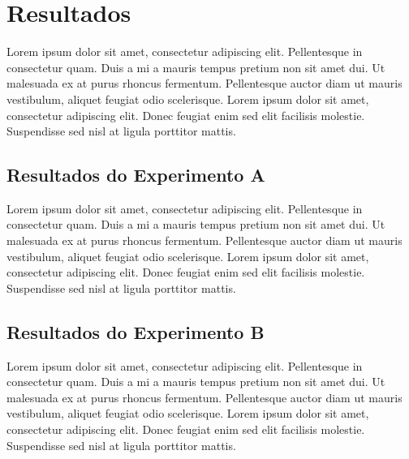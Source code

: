 \chapter{Resultados}
\label{chap:resultados}

Lorem ipsum dolor sit amet, consectetur adipiscing elit. Pellentesque in consectetur quam. Duis a mi a mauris tempus pretium non sit amet dui. Ut malesuada ex at purus rhoncus fermentum. Pellentesque auctor diam ut mauris vestibulum, aliquet feugiat odio scelerisque. Lorem ipsum dolor sit amet, consectetur adipiscing elit. Donec feugiat enim sed elit facilisis molestie. Suspendisse sed nisl at ligula porttitor mattis.

\section{Resultados do Experimento A}
\label{sec:resultados-do-experimento-a}

Lorem ipsum dolor sit amet, consectetur adipiscing elit. Pellentesque in consectetur quam. Duis a mi a mauris tempus pretium non sit amet dui. Ut malesuada ex at purus rhoncus fermentum. Pellentesque auctor diam ut mauris vestibulum, aliquet feugiat odio scelerisque. Lorem ipsum dolor sit amet, consectetur adipiscing elit. Donec feugiat enim sed elit facilisis molestie. Suspendisse sed nisl at ligula porttitor mattis.

\begin{table}[h!]
  \centering
\end{table}

\section{Resultados do Experimento B}
\label{sec:resultados-do-experimento-b}

Lorem ipsum dolor sit amet, consectetur adipiscing elit. Pellentesque in consectetur quam. Duis a mi a mauris tempus pretium non sit amet dui. Ut malesuada ex at purus rhoncus fermentum. Pellentesque auctor diam ut mauris vestibulum, aliquet feugiat odio scelerisque. Lorem ipsum dolor sit amet, consectetur adipiscing elit. Donec feugiat enim sed elit facilisis molestie. Suspendisse sed nisl at ligula porttitor mattis.
